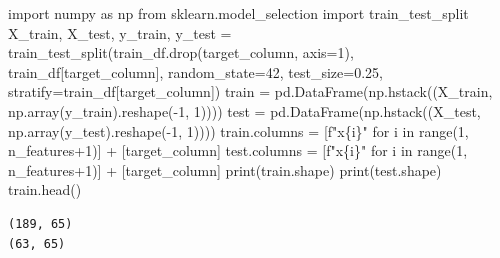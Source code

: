\documentclass[
  letterpaper,
  DIV=11,
  numbers=noendperiod]{scrreprt}
\newenvironment{Shaded}{\begin{snugshade}}{\end{snugshade}}
\newcommand{\BuiltInTok}[1]{\textcolor[rgb]{0.00,0.23,0.31}{#1}}
\newcommand{\ControlFlowTok}[1]{\textcolor[rgb]{0.00,0.23,0.31}{#1}}
\newcommand{\DecValTok}[1]{\textcolor[rgb]{0.68,0.00,0.00}{#1}}
\newcommand{\FloatTok}[1]{\textcolor[rgb]{0.68,0.00,0.00}{#1}}
\newcommand{\ImportTok}[1]{\textcolor[rgb]{0.00,0.46,0.62}{#1}}
\newcommand{\KeywordTok}[1]{\textcolor[rgb]{0.00,0.23,0.31}{#1}}
\newcommand{\NormalTok}[1]{\textcolor[rgb]{0.00,0.23,0.31}{#1}}
\newcommand{\OperatorTok}[1]{\textcolor[rgb]{0.37,0.37,0.37}{#1}}
\newcommand{\SpecialCharTok}[1]{\textcolor[rgb]{0.37,0.37,0.37}{#1}}
\newcommand{\SpecialStringTok}[1]{\textcolor[rgb]{0.13,0.47,0.30}{#1}}
\begin{document}
\begin{Shaded}
\begin{Highlighting}[]
\ImportTok{import}\NormalTok{ numpy }\ImportTok{as}\NormalTok{ np}
\ImportTok{from}\NormalTok{ sklearn.model\_selection }\ImportTok{import}\NormalTok{ train\_test\_split}
\NormalTok{X\_train, X\_test, y\_train, y\_test }\OperatorTok{=}\NormalTok{ train\_test\_split(train\_df.drop(target\_column, axis}\OperatorTok{=}\DecValTok{1}\NormalTok{), train\_df[target\_column],}
\NormalTok{                                                    random\_state}\OperatorTok{=}\DecValTok{42}\NormalTok{,}
\NormalTok{                                                    test\_size}\OperatorTok{=}\FloatTok{0.25}\NormalTok{,}
\NormalTok{                                                    stratify}\OperatorTok{=}\NormalTok{train\_df[target\_column])}
\NormalTok{train }\OperatorTok{=}\NormalTok{ pd.DataFrame(np.hstack((X\_train, np.array(y\_train).reshape(}\OperatorTok{{-}}\DecValTok{1}\NormalTok{, }\DecValTok{1}\NormalTok{))))}
\NormalTok{test }\OperatorTok{=}\NormalTok{ pd.DataFrame(np.hstack((X\_test, np.array(y\_test).reshape(}\OperatorTok{{-}}\DecValTok{1}\NormalTok{, }\DecValTok{1}\NormalTok{))))}
\NormalTok{train.columns }\OperatorTok{=}\NormalTok{ [}\SpecialStringTok{f"x}\SpecialCharTok{\{}\NormalTok{i}\SpecialCharTok{\}}\SpecialStringTok{"} \ControlFlowTok{for}\NormalTok{ i }\KeywordTok{in} \BuiltInTok{range}\NormalTok{(}\DecValTok{1}\NormalTok{, n\_features}\OperatorTok{+}\DecValTok{1}\NormalTok{)] }\OperatorTok{+}\NormalTok{ [target\_column]}
\NormalTok{test.columns }\OperatorTok{=}\NormalTok{ [}\SpecialStringTok{f"x}\SpecialCharTok{\{}\NormalTok{i}\SpecialCharTok{\}}\SpecialStringTok{"} \ControlFlowTok{for}\NormalTok{ i }\KeywordTok{in} \BuiltInTok{range}\NormalTok{(}\DecValTok{1}\NormalTok{, n\_features}\OperatorTok{+}\DecValTok{1}\NormalTok{)] }\OperatorTok{+}\NormalTok{ [target\_column]}
\BuiltInTok{print}\NormalTok{(train.shape)}
\BuiltInTok{print}\NormalTok{(test.shape)}
\NormalTok{train.head()}
\end{Highlighting}
\end{Shaded}

\begin{verbatim}
(189, 65)
(63, 65)
\end{verbatim}
\end{document}
